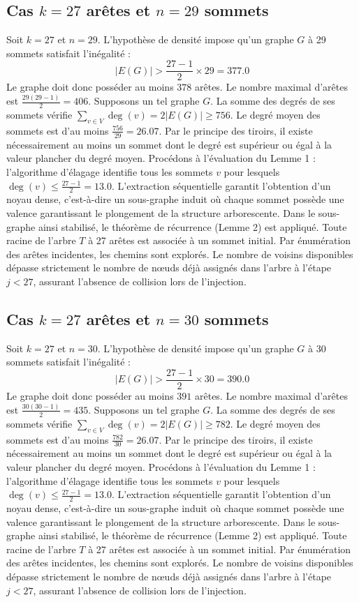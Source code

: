\documentclass[12pt,a4paper]{article}
\begin{document}
\subsection{Cas $k = 27$ arêtes et $n = 29$ sommets}
Soit $k = 27$ et $n = 29$. L'hypothèse de densité impose qu'un graphe $G$ à 29 sommets satisfait l'inégalité :
$$ |E(G)| > \frac{27-1}{2} \times 29 = 377.0 $$
Le graphe doit donc posséder au moins $378$ arêtes. Le nombre maximal d'arêtes est $\frac{29(29-1)}{2} = 406$.
Supposons un tel graphe $G$. La somme des degrés de ses sommets vérifie $\sum_{v \in V} \deg(v) = 2|E(G)| \geq 756$.
Le degré moyen des sommets est d'au moins $\frac{756}{29} = 26.07$.
Par le principe des tiroirs, il existe nécessairement au moins un sommet dont le degré est supérieur ou égal à la valeur plancher du degré moyen.
Procédons à l'évaluation du Lemme 1 : l'algorithme d'élagage identifie tous les sommets $v$ pour lesquels $\deg(v) \leq \frac{27-1}{2} = 13.0$.
L'extraction séquentielle garantit l'obtention d'un noyau dense, c'est-à-dire un sous-graphe induit où chaque sommet possède une valence garantissant le plongement de la structure arborescente.
Dans le sous-graphe ainsi stabilisé, le théorème de récurrence (Lemme 2) est appliqué. Toute racine de l'arbre $T$ à 27 arêtes est associée à un sommet initial. Par énumération des arêtes incidentes, les chemins sont explorés. Le nombre de voisins disponibles dépasse strictement le nombre de nœuds déjà assignés dans l'arbre à l'étape $j < 27$, assurant l'absence de collision lors de l'injection.

\subsection{Cas $k = 27$ arêtes et $n = 30$ sommets}
Soit $k = 27$ et $n = 30$. L'hypothèse de densité impose qu'un graphe $G$ à 30 sommets satisfait l'inégalité :
$$ |E(G)| > \frac{27-1}{2} \times 30 = 390.0 $$
Le graphe doit donc posséder au moins $391$ arêtes. Le nombre maximal d'arêtes est $\frac{30(30-1)}{2} = 435$.
Supposons un tel graphe $G$. La somme des degrés de ses sommets vérifie $\sum_{v \in V} \deg(v) = 2|E(G)| \geq 782$.
Le degré moyen des sommets est d'au moins $\frac{782}{30} = 26.07$.
Par le principe des tiroirs, il existe nécessairement au moins un sommet dont le degré est supérieur ou égal à la valeur plancher du degré moyen.
Procédons à l'évaluation du Lemme 1 : l'algorithme d'élagage identifie tous les sommets $v$ pour lesquels $\deg(v) \leq \frac{27-1}{2} = 13.0$.
L'extraction séquentielle garantit l'obtention d'un noyau dense, c'est-à-dire un sous-graphe induit où chaque sommet possède une valence garantissant le plongement de la structure arborescente.
Dans le sous-graphe ainsi stabilisé, le théorème de récurrence (Lemme 2) est appliqué. Toute racine de l'arbre $T$ à 27 arêtes est associée à un sommet initial. Par énumération des arêtes incidentes, les chemins sont explorés. Le nombre de voisins disponibles dépasse strictement le nombre de nœuds déjà assignés dans l'arbre à l'étape $j < 27$, assurant l'absence de collision lors de l'injection.
\end{document}
